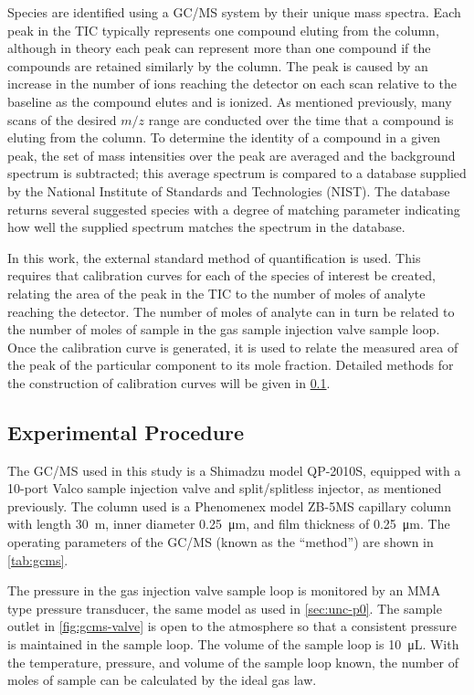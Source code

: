 \documentclass[../main.tex]{subfiles}
\begin{document}
Species are identified using a GC/MS system by their unique mass spectra.
Each peak in the TIC typically represents one compound eluting from the
column, although in theory each peak can represent more than one compound
if the compounds are retained similarly by the column. The peak is caused
by an increase in the number of ions reaching the detector on each scan
relative to the baseline as the compound elutes and is ionized. As
mentioned previously, many scans of the desired $m/z$ range are
conducted over the time that a compound is eluting from the column.
To determine the identity of a compound in a given peak, the set of
mass intensities over the peak are averaged and the background
spectrum is subtracted; this average spectrum is compared to a
database supplied by the National Institute of Standards and
Technologies (NIST). The database returns several suggested species
with a degree of matching parameter indicating how well the supplied
spectrum matches the spectrum in the database.

In this work, the external standard method of quantification is used.
This requires that calibration curves for each of the species of
interest be created, relating the area of the peak in the TIC to
the number of moles of analyte reaching the detector. The number of
moles of analyte can in turn be related to the number of moles of
sample in the gas sample injection valve sample loop. Once the
calibration curve is generated, it is used to relate the measured
area of the peak of the particular component to its mole fraction. Detailed
methods for the construction of calibration curves will be given in
\cref{sec:gcms-procedure}.

\subsection{Experimental Procedure}
\label{sec:gcms-procedure}

The GC/MS used in this study is a
Shimadzu model QP-2010S, equipped with a 10-port Valco sample injection
valve and split/splitless injector, as mentioned previously. The column
used is a Phenomenex model ZB-5MS capillary column
with length \SI{30}{\meter}, inner diameter \SI{0.25}{\micro\meter}, and film
thickness of \SI{0.25}{\micro\meter}. The operating parameters of the GC/MS
(known as the ``method'') are shown in \cref{tab:gcms}.

The pressure in the gas injection valve sample loop is monitored by an
MMA type pressure transducer, the same model as used in \cref{sec:unc-p0}. The
sample outlet in \cref{fig:gcms-valve} is open to the atmosphere
so that a consistent pressure is maintained in the sample loop.
The volume of the sample loop is \SI{10}{\micro\liter}. With
the temperature, pressure, and volume of the sample loop known,
the number of moles of sample can be calculated by the ideal
gas law.
\end{document}
